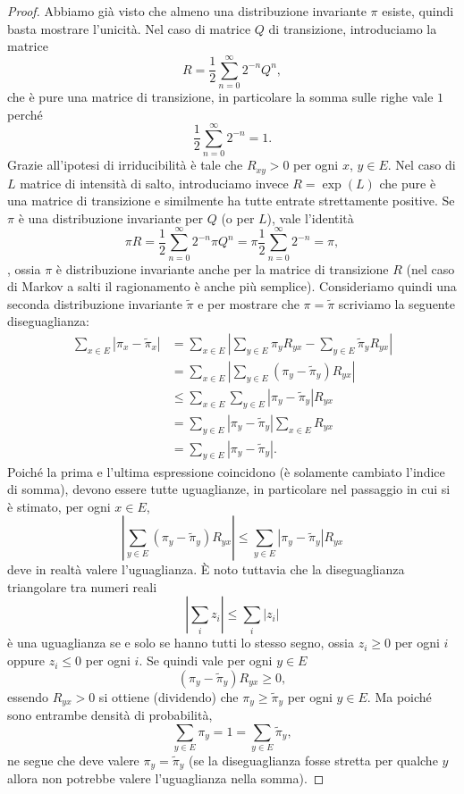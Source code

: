 \documentclass[
  italian,
  letterpaper,
]{book}
\theoremstyle{definition}
\theoremstyle{remark}
\begin{document}
\begin{proof}
Abbiamo già visto che almeno una distribuzione invariante \(\pi\)
esiste, quindi basta mostrare l'unicità. Nel caso di matrice \(Q\) di
transizione, introduciamo la matrice
\[  R = \frac 1 2 \sum_{n=0}^\infty 2^{-n} Q^n,\] che è pure una matrice
di transizione, in particolare la somma sulle righe vale \(1\) perché
\[ \frac 1 2 \sum_{n=0}^\infty 2^{-n} = 1.\] Grazie all'ipotesi di
irriducibilità è tale che \(R_{xy}>0\) per ogni \(x\), \(y \in E\). Nel
caso di \(L\) matrice di intensità di salto, introduciamo invece
\(R = \exp(L)\) che pure è una matrice di transizione e similmente ha
tutte entrate strettamente positive. Se \(\pi\) è una distribuzione
invariante per \(Q\) (o per \(L\)), vale l'identità
\[ \pi R  = \frac 1 2 \sum_{n=0}^\infty 2^{-n}  \pi Q^ n =  \pi \frac  1 2 \sum_{n=0}^\infty 2^{-n} = \pi,\],
ossia \(\pi\) è distribuzione invariante anche per la matrice di
transizione \(R\) (nel caso di Markov a salti il ragionamento è anche
più semplice). Consideriamo quindi una seconda distribuzione invariante
\(\tilde{\pi}\) e per mostrare che \(\pi = \tilde \pi\) scriviamo la
seguente diseguaglianza:
\[\begin{split} \sum_{x \in E} | \pi_x - \tilde \pi_x| & = \sum_{x \in E}  | \sum_{y \in E} \pi_y R_{yx} - \sum_{y \in E} \tilde \pi_y R_{yx}| \\
& = \sum_{x \in E}  | \sum_{y \in E} (\pi_y - \tilde \pi_y) R_{yx} | \\
& \le \sum_{x \in E} \sum_{y \in E} | \pi_y-\tilde \pi_y| R_{yx} \\
& =  \sum_{y \in E} | \pi_y-\tilde \pi_y| \sum_{x \in E} R_{yx} \\
& = \sum_{y \in E} | \pi_y-\tilde \pi_y|.\end{split}\] Poiché la prima e
l'ultima espressione coincidono (è solamente cambiato l'indice di
somma), devono essere tutte uguaglianze, in particolare nel passaggio in
cui si è stimato, per ogni \(x \in E\),
\[ | \sum_{y \in E} (\pi_y - \tilde \pi_y) R_{yx} | \le \sum_{y \in E} | \pi_y-\tilde \pi_y| R_{yx}\]
deve in realtà valere l'uguaglianza. È noto tuttavia che la
diseguaglianza triangolare tra numeri reali
\[ | \sum_i z_i | \le \sum_i |z_i|\] è una uguaglianza se e solo se
hanno tutti lo stesso segno, ossia \(z_i \ge 0\) per ogni \(i\) oppure
\(z_i \le 0\) per ogni \(i\). Se quindi vale per ogni \(y \in E\)
\[ (\pi_y - \tilde \pi_y )R_{yx} \ge 0,\] essendo \(R_{yx}>0\) si
ottiene (dividendo) che \(\pi_y \ge \tilde \pi_y\) per ogni \(y \in E\).
Ma poiché sono entrambe densità di probabilità,
\[ \sum_{y \in E} \pi _y = 1 = \sum_{y \in E}\tilde{\pi}_y,\] ne segue
che deve valere \(\pi_y = \tilde \pi_y\) (se la diseguaglianza fosse
stretta per qualche \(y\) allora non potrebbe valere l'uguaglianza nella
somma).
\end{proof}
\end{document}
